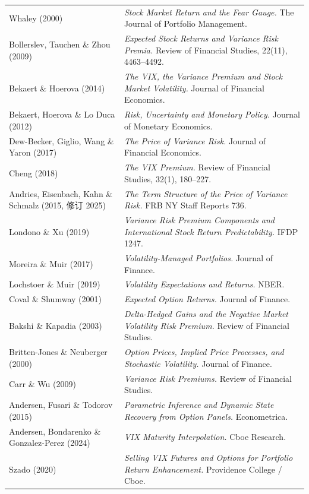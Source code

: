 \documentclass[11pt,a4paper]{ctexart}
\newenvironment{vtable}[1]
  {\begin{longtable}{#1}\toprule}
  {\bottomrule\end{longtable}}
\begin{document}
\begin{vtable}{>{\raggedright\arraybackslash}p{}>{\raggedright\arraybackslash}p{0.62\textwidth}}
Whaley (2000) & \textit{Stock Market Return and the Fear Gauge.} The Journal of Portfolio Management.\\
Bollerslev, Tauchen \& Zhou (2009) & \textit{Expected Stock Returns and Variance Risk Premia.} Review of Financial Studies, 22(11), 4463--4492.\\
Bekaert \& Hoerova (2014) & \textit{The VIX, the Variance Premium and Stock Market Volatility.} Journal of Financial Economics.\\
Bekaert, Hoerova \& Lo Duca (2012) & \textit{Risk, Uncertainty and Monetary Policy.} Journal of Monetary Economics.\\
Dew-Becker, Giglio, Wang \& Yaron (2017) & \textit{The Price of Variance Risk.} Journal of Financial Economics.\\
Cheng (2018) & \textit{The VIX Premium.} Review of Financial Studies, 32(1), 180--227.\\
Andries, Eisenbach, Kahn \& Schmalz (2015, 修订 2025) & \textit{The Term Structure of the Price of Variance Risk.} FRB NY Staff Reports 736.\\
Londono \& Xu (2019) & \textit{Variance Risk Premium Components and International Stock Return Predictability.} IFDP 1247.\\
Moreira \& Muir (2017) & \textit{Volatility-Managed Portfolios.} Journal of Finance.\\
Lochstoer \& Muir (2019) & \textit{Volatility Expectations and Returns.} NBER.\\
Coval \& Shumway (2001) & \textit{Expected Option Returns.} Journal of Finance.\\
Bakshi \& Kapadia (2003) & \textit{Delta-Hedged Gains and the Negative Market Volatility Risk Premium.} Review of Financial Studies.\\
Britten-Jones \& Neuberger (2000) & \textit{Option Prices, Implied Price Processes, and Stochastic Volatility.} Journal of Finance.\\
Carr \& Wu (2009) & \textit{Variance Risk Premiums.} Review of Financial Studies.\\
Andersen, Fusari \& Todorov (2015) & \textit{Parametric Inference and Dynamic State Recovery from Option Panels.} Econometrica.\\
Andersen, Bondarenko \& Gonzalez-Perez (2024) & \textit{VIX Maturity Interpolation.} Cboe Research.\\
Szado (2020) & \textit{Selling VIX Futures and Options for Portfolio Return Enhancement.} Providence College / Cboe.\\

\end{vtable}
\end{document}
